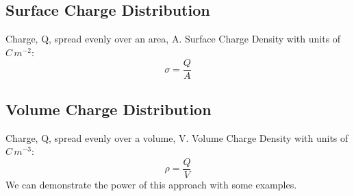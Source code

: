 \documentclass[a4paper, 11pt, normalem]{report}
\begin{document}
\subsection{Surface Charge Distribution}
Charge, Q, spread evenly over an area, A. 
Surface Charge Density with units of $C\,m^{-2}$:
\begin{equation}
    \sigma = \frac{Q}{A}
\end{equation}

\subsection{Volume Charge Distribution}
Charge, Q, spread evenly over a volume, V. 
Volume Charge Density with units of $C\,m^{-3}$:
\begin{equation}
    \rho = \frac{Q}{V}
\end{equation}
We can demonstrate the power of this approach with some examples.
\end{document}
